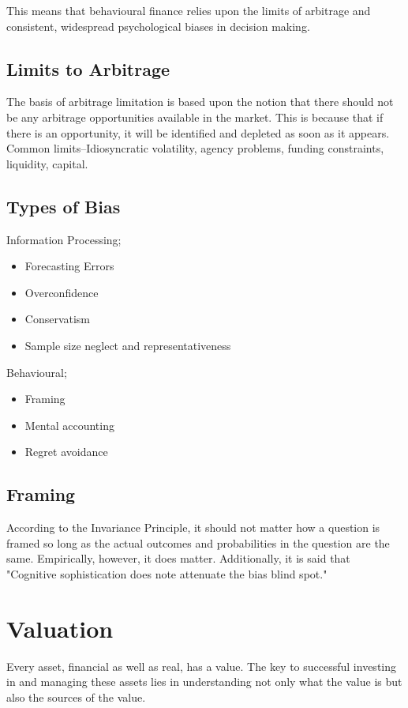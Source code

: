 \documentclass[a4paper]{article}
\begin{document}
This means that behavioural finance relies upon the limits of arbitrage and
consistent, widespread psychological biases in decision making.

\subsection{Limits to Arbitrage}
The basis of arbitrage limitation is based upon the notion that there should
not be any arbitrage opportunities available in the market. This is because
that if there is an opportunity, it will be identified and depleted
as soon as it appears. Common limits--Idiosyncratic volatility,
agency problems, funding
constraints, liquidity, capital.

\subsection{Types of Bias}
Information Processing;
\begin{itemize}
\item Forecasting Errors
\item Overconfidence
\item Conservatism
\item Sample size neglect and representativeness
\end{itemize}
Behavioural;
\begin{itemize}
\item Framing
\item Mental accounting
\item Regret avoidance
\end{itemize}

\subsection{Framing}
According to the Invariance Principle, it should not matter how a question is
framed so long as the actual outcomes and probabilities in the question are the
same. Empirically, however, it does matter. Additionally, it is said that
"Cognitive sophistication does note attenuate the bias blind spot."


\section{Valuation}
Every asset, financial as well as real, has a value. The key to successful
investing in and managing these assets lies in understanding not only what the
value is but also the sources of the value.
\end{document}
